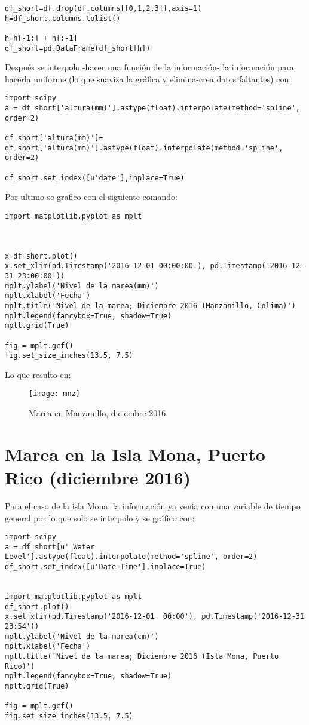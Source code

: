 \documentclass[12pt,letterpaper]{article}
\begin{document}
\begin{verbatim}
df_short=df.drop(df.columns[[0,1,2,3]],axis=1)
h=df_short.columns.tolist()

h=h[-1:] + h[:-1]
df_short=pd.DataFrame(df_short[h])
\end{verbatim}

Después se interpolo -hacer una función de la información- la información para hacerla uniforme (lo que suaviza la gráfica y elimina-crea datos faltantes) con:

\begin{verbatim}
import scipy
a = df_short['altura(mm)'].astype(float).interpolate(method='spline', order=2)

df_short['altura(mm)']= df_short['altura(mm)'].astype(float).interpolate(method='spline', order=2)

df_short.set_index([u'date'],inplace=True)
\end{verbatim}

Por ultimo se grafico con el siguiente comando:

\begin{verbatim}
import matplotlib.pyplot as mplt



x=df_short.plot()
x.set_xlim(pd.Timestamp('2016-12-01 00:00:00'), pd.Timestamp('2016-12-31 23:00:00'))
mplt.ylabel('Nivel de la marea(mm)')
mplt.xlabel('Fecha')
mplt.title('Nivel de la marea; Diciembre 2016 (Manzanillo, Colima)')
mplt.legend(fancybox=True, shadow=True)
mplt.grid(True)

fig = mplt.gcf()
fig.set_size_inches(13.5, 7.5)
\end{verbatim}

Lo que resulto en:

\begin{figure}[H]
	\centering	\texttt{[image: mnz]}
	\caption{Marea en Manzanillo, diciembre 2016}
\end{figure}

\section{Marea en la Isla Mona, Puerto Rico (diciembre 2016)}

Para el caso de la isla Mona, la información ya venia con una variable de tiempo general por lo que solo se interpolo y se gráfico con:

\begin{verbatim}
import scipy
a = df_short[u' Water Level'].astype(float).interpolate(method='spline', order=2)
df_short.set_index([u'Date Time'],inplace=True)


import matplotlib.pyplot as mplt
df_short.plot()
x.set_xlim(pd.Timestamp('2016-12-01  00:00'), pd.Timestamp('2016-12-31 23:54'))
mplt.ylabel('Nivel de la marea(cm)')
mplt.xlabel('Fecha')
mplt.title('Nivel de la marea; Diciembre 2016 (Isla Mona, Puerto Rico)')
mplt.legend(fancybox=True, shadow=True)
mplt.grid(True)

fig = mplt.gcf()
fig.set_size_inches(13.5, 7.5)
\end{verbatim}
\end{document}
